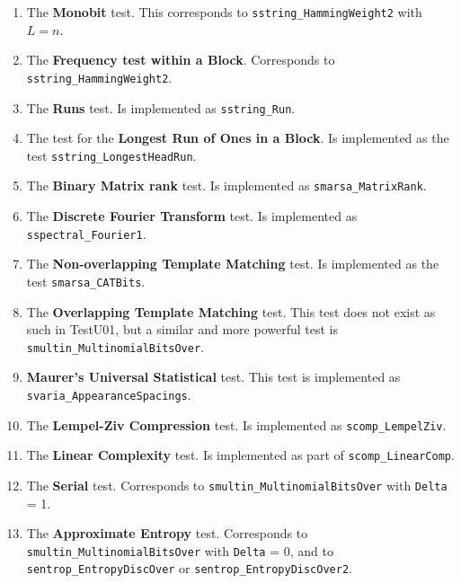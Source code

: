 \begin{enumerate}
\item The {\bf Monobit} test. This corresponds to
 {\tt sstring\_HammingWeight2} with $L = n$.

\item The {\bf Frequency test within a  Block}. Corresponds to
 {\tt sstring\_HammingWeight2}.

\item The {\bf Runs} test.   Is implemented as {\tt sstring\_Run}.

\item The test for the {\bf Longest Run of Ones in a Block}.
 Is implemented as the test
 {\tt sstring\_LongestHeadRun}.

\item The {\bf Binary Matrix rank} test.  Is implemented as
 {\tt smarsa\_MatrixRank}.

\item The {\bf Discrete Fourier Transform} test.  Is implemented as
 {\tt sspectral\_Fourier1}.

\item The {\bf Non-overlapping Template Matching} test. Is implemented
  as the test {\tt smarsa\_CATBits}.

\item The {\bf Overlapping Template Matching} test. This test does not
exist as such in TestU01, but a similar and more powerful test is
{\tt smultin\_MultinomialBitsOver}.

\item {\bf Maurer's Universal Statistical} test. This test is implemented as
 {\tt svaria\_Appear\-anceSpacings}.

\item The {\bf Lempel-Ziv Compression} test.  Is implemented as
 {\tt scomp\_LempelZiv}.

\item The {\bf Linear Complexity} test. Is implemented as part of
 {\tt scomp\_LinearComp}.

\item The {\bf Serial} test.  Corresponds to
 {\tt smultin\_MultinomialBitsOver} with  {\tt Delta} = 1.

\item The {\bf Approximate Entropy} test.  Corresponds to
 {\tt smultin\_MultinomialBitsOver} with  {\tt Delta} = 0, and to
 {\tt sentrop\_EntropyDiscOver} or  {\tt sentrop\_EntropyDiscOver2}.


\end{enumerate}
